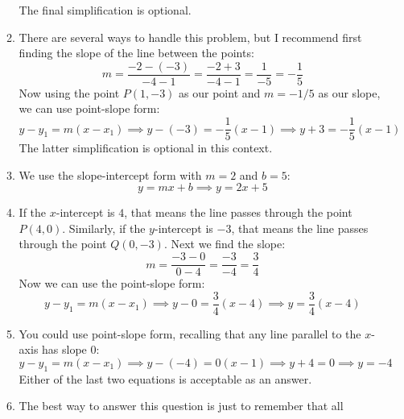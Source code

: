 \documentclass{article}
\begin{document}
\begin{enumerate}
\begin{enumerate}
\begin{equation*}
    \end{equation*}
    The final simplification is optional.
  \item %
    There are several ways to handle this problem, but I recommend
    first finding the slope of the line between the points:
    \begin{equation*}
      m = \frac{-2-(-3)}{-4-1} = \frac{-2+3}{-4-1} = \frac{1}{-5} =
      -\frac{1}{5} 
    \end{equation*}
    Now using the point $P(1,-3)$ as our point and $m=-1/5$ as our
    slope, we can use point-slope form:
    \begin{equation*}
      y-y_1 = m(x-x_1) \implies y-(-3) = -\frac{1}{5}(x-1)
      \implies y+3 = -\frac{1}{5}(x-1)
    \end{equation*}
    The latter simplification is optional in this context.
  \item %
    We use the slope-intercept form with $m=2$ and $b=5$:
    \begin{equation*}
      y= mx+b \implies y = 2x + 5
    \end{equation*}
  \item %
    If the $x$-intercept is $4$, that means the line passes through
    the point $P(4,0)$.  Similarly, if the $y$-intercept is $-3$, that
    means the line passes through the point $Q(0,-3)$.  Next we find
    the slope:
    \begin{equation*}
      m = \frac{-3-0}{0-4} = \frac{-3}{-4} = \frac{3}{4}
    \end{equation*}
    Now we can use the point-slope form:
    \begin{equation*}
      y-y_1 = m(x-x_1) \implies y-0 = \frac{3}{4} (x-4)
      \implies y = \frac{3}{4} (x-4)
    \end{equation*}
  \item %
    You could use point-slope form, recalling that any line parallel
    to the $x$-axis has slope $0$:
    \begin{equation*}
      y-y_1 = m(x-x_1) \implies y-(-4) = 0 (x-1)
      \implies y+4 = 0 \implies y = -4
    \end{equation*}
    Either of the last two equations is acceptable as an answer.
  \item %
    The best way to answer this question is just to remember that all

\end{enumerate}
\end{enumerate}
\end{document}
